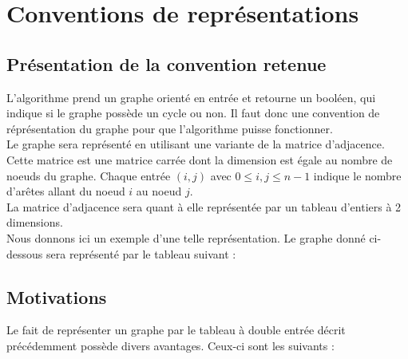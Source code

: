 \section{Conventions de représentations}

\subsection*{Présentation de la convention retenue}
L'algorithme prend un graphe orienté en entrée et retourne un booléen, qui indique si le graphe possède un cycle ou non. Il faut donc une convention de réprésentation du graphe pour que l'algorithme puisse fonctionner. \\

Le graphe sera représenté en utilisant une variante de la matrice d'adjacence. Cette matrice est une matrice carrée dont la dimension est égale au nombre de noeuds du graphe. Chaque entrée $(i,j)$ avec $0\leq i,j \leq n-1$ indique le nombre d'arêtes allant du noeud $i$ au noeud $j$.\\

La matrice d'adjacence sera quant à elle représentée par un tableau d'entiers à 2 dimensions. \\

Nous donnons ici un exemple d'une telle représentation. Le graphe donné ci-dessous sera représenté par le tableau suivant : 

\subsection*{Motivations}
Le fait de représenter un graphe par le tableau à double entrée décrit précédemment possède divers avantages. Ceux-ci sont les suivants : \\

